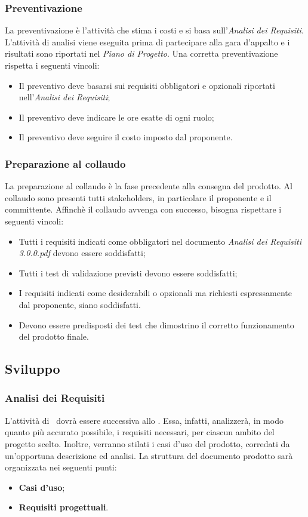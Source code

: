 		\subsubsection{Preventivazione}
		La preventivazione è l'attività che stima i costi e si basa sull'\textit{Analisi dei Requisiti}. L'attività di analisi viene eseguita prima di partecipare alla gara d'appalto e i risultati sono riportati nel \textit{Piano di Progetto}. Una corretta preventivazione rispetta i seguenti vincoli:
		\begin{itemize}
			\item Il preventivo deve basarsi sui requisiti obbligatori e opzionali riportati nell'\textit{Analisi dei Requisiti};
			\item Il preventivo deve indicare le ore esatte di ogni ruolo;
			\item  Il preventivo deve seguire il costo imposto dal proponente.
		\end{itemize}
	
		\subsubsection{Preparazione al collaudo}
		La preparazione al collaudo è la fase precedente alla consegna del prodotto. Al collaudo sono presenti tutti stakeholders, in particolare il proponente e il committente. Affinchè il collaudo avvenga con successo, bisogna rispettare i seguenti vincoli:
		\begin{itemize}
			\item Tutti i requisiti indicati come obbligatori nel documento  \textit{Analisi dei Requisiti 3.0.0.pdf} devono essere soddisfatti;
			\item Tutti i test di validazione previsti devono essere soddisfatti;
			\item I requisiti indicati come desiderabili o opzionali ma richiesti espressamente  dal proponente, siano soddisfatti.
			\item Devono essere predisposti dei test che dimostrino il corretto funzionamento del prodotto finale.
		\end{itemize}
		
		
	\newpage
	\subsection{Sviluppo}
		 \subsubsection{Analisi dei Requisiti}
		L'attività di \AdR\ dovrà essere successiva allo \SdF. Essa, infatti, analizzerà, in modo quanto più accurato possibile, i requisiti necessari, per ciascun ambito del progetto scelto. Inoltre, verranno stilati i casi d'uso del prodotto, corredati da un'opportuna descrizione ed analisi. La struttura del documento prodotto sarà organizzata nei seguenti punti:
		\begin{itemize}
			\item \textbf{Casi d'uso};
			\item \textbf{Requisiti progettuali}.
		\end{itemize}
		
